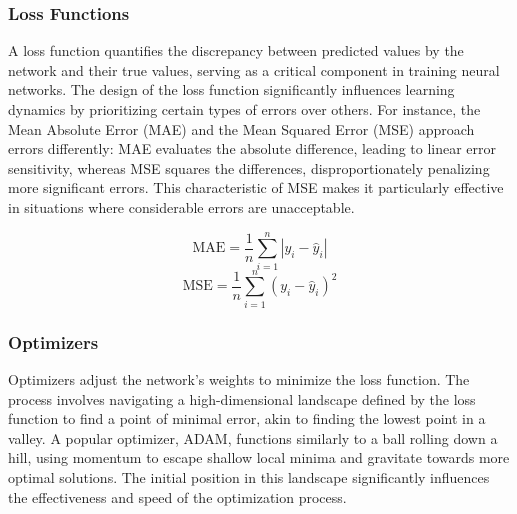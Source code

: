 \subsubsection{Loss Functions}
\label{subsubsec: loss_functions}
A loss function quantifies the discrepancy between predicted values by the network and their true values, serving as a critical component in training neural networks. The design of the loss function significantly influences learning dynamics by prioritizing certain types of errors over others\cite{Ciampiconi2023}. For instance, the Mean Absolute Error (MAE) and the Mean Squared Error (MSE) approach errors differently: MAE evaluates the absolute difference, leading to linear error sensitivity, whereas MSE squares the differences, disproportionately penalizing more significant errors. This characteristic of MSE makes it particularly effective in situations where considerable errors are unacceptable.

\[
\text{MAE} = \frac{1}{n} \sum_{i=1}^{n} |y_i - \hat{y}_i|
\]
\[
\text{MSE} = \frac{1}{n} \sum_{i=1}^{n} (y_i - \hat{y}_i)^2
\]

\subsubsection{Optimizers}
Optimizers adjust the network's weights to minimize the loss function. The process involves navigating a high-dimensional landscape defined by the loss function to find a point of minimal error, akin to finding the lowest point in a valley. A popular optimizer, ADAM, functions similarly to a ball rolling down a hill, using momentum to escape shallow local minima and gravitate towards more optimal solutions\cite{Ruder2016}. The initial position in this landscape significantly influences the effectiveness and speed of the optimization process.

